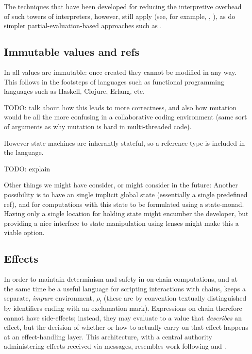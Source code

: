 The techniques that have been developed for reducing the interpretive overhead
of such towers of interpreters, however, still
apply (see, for example, \cite{Amin2017}, \cite{Asai2014}), as do simpler
partial-evaluation-based approaches such as \cite{Brown2017}.

\subsection{Immutable values and refs}
In \rad all values are immutable: once created they cannot be modified in any
way. This follows in the footsteps of languages such as functional programming
languages such as Haskell, Clojure, Erlang, etc.

TODO: talk about how this leads to more correctness, and also how mutation would
be all the more confusing in a collaborative coding environment (same sort of
arguments as why mutation is hard in multi-threaded code).

However state-machines are inherantly stateful, so a reference type is included
in the language.

TODO: explain

Other things we might have consider, or might consider in the future: Another
possibility is to have an single implicit global state (essentially a single
predefined ref), and for computations with this state to be formulated using a
state-monad. Having only a single location for holding state might encumber the
developer, but providing a nice interface to state manipulation using lenses
might make this a viable option.


\subsection{Effects} In order to maintain determinism and safety in on-chain
computations, and at the same time be a useful language for scripting
interactions with chains, \rad keeps a separate, \emph{impure} environment,
$\rho_{!}$ (these are by convention textually distinguished by identifiers
ending with an exclamation mark). Expressions on chain therefore cannot have
side-effects; instead, they may evaluate to a value that \emph{describes} an effect,
but the decision of whether or how to actually carry on that effect happens at an
effect-handling layer. This architecture, with a central authority
administering effects received via messages, resembles work following
\cite{Cartwright1994} and \cite{Bauer2003}.


